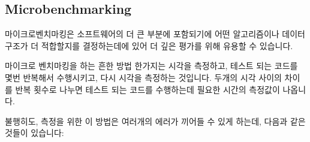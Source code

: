 \subsection{Microbenchmarking}
\label{sec:debugging:Microbenchmarking}

마이크로벤치마킹은 소프트웨어의 더 큰 부분에 포함되기에 어떤 알고리즘이나
데이터 구조가 더 적합할지를 결정하는데에 있어 더 깊은 평가를 위해 유용할 수
있습니다.

마이크로 벤치마킹을 하는 흔한 방법 한가지는 시각을 측정하고, 테스트 되는 코드를
몇번 반복해서 수행시키고, 다시 시각을 측정하는 것입니다.
두개의 시각 사이의 차이를 반복 횟수로 나누면 테스트 되는 코드를 수행하는데
필요한 시간의 측정값이 나옵니다.

불행히도, 측정을 위한 이 방법은 여러개의 에러가 끼어들 수 있게 하는데, 다음과
같은 것들이 있습니다:

